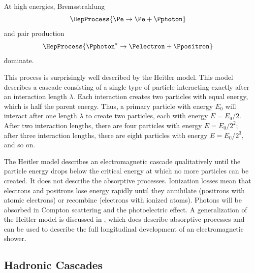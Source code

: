 At high energies, Bremsstrahlung
\begin{equation}
\HepProcess{\Pe \to \Pe + \Pphoton}
\end{equation}
and pair production
\begin{equation}
\HepProcess{\Pphoton^* \to \Pelectron + \Ppositron}
\end{equation}
dominate.

This process is surprisingly well described by the Heitler model.  This
model describes a cascade consisting of a single type of particle interacting
exactly after an interaction length $\lambda$.  Each interaction creates two
particles with equal energy, which is half the parent energy.  Thus, a
primary particle with energy $E_0$ will interact after one length $\lambda$ to
create two particles, each with energy $E = E_0 / 2$.  After two interaction
lengths, there are four particles with energy $E = E_0 / 2^2$; after three
interaction lengths, there are eight particles with energy $E = E_0 / 2^3$, and so
on.

The Heitler model \cite{Heitler:1954} describes an electromagnetic cascade
qualitatively until the particle energy drops below the critical energy at which
no more particles can be created.  It does not describe the absorptive
processes.  Ionization losses mean that electrons and positrons lose energy
rapidly until they annihilate (positrons with atomic electrons) or recombine
(electrons with ionized atoms).
Photons will be absorbed in Compton scattering and the photoelectric effect. A
generalization of the Heitler model is discussed in \cite{Montanus:2011}, which
does describe absorptive processes and can be used to describe the full
longitudinal development of an electromagnetic shower.


\subsection{Hadronic Cascades}

